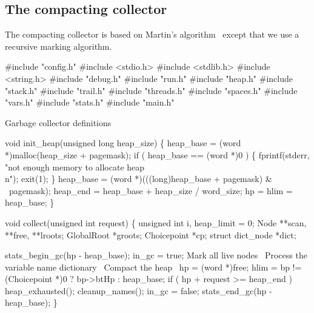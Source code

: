 %
%
\subsection{The compacting collector}
The compacting collector is based on Martin's                                %
algorithm~\cite{Martin82:Compaction} except that we use a recursive
marking algorithm.

\nwenddocs{}\endmoddef\nwstartdeflinemarkup{}\nwenddeflinemarkup
#include "config.h"
#include <stdio.h>
#include <stdlib.h>
#include <string.h>       
#include "debug.h"
#include "run.h"
#include "heap.h"
#include "stack.h"
#include "trail.h"
#include "threads.h"
#include "spaces.h"
#include "vars.h"
#include "stats.h"
#include "main.h"

\LA{}Garbage collector definitions~{\nwtagstyle{}}\RA{}

void
init_heap(unsigned long heap_size)
\{
    heap_base = (word *)malloc(heap_size + pagemask);
    if ( heap_base == (word *)0 )
    \{
        fprintf(stderr, "not enough memory to allocate heap\\n");
        exit(1);
    \}
    heap_base = (word *)(((long)heap_base + pagemask) & ~pagemask);
    heap_end  = heap_base + heap_size / word_size;
    hp = hlim = heap_base;
\}

void
collect(unsigned int request)
\{
    unsigned int     i, heap_limit = 0;
    Node             **scan, **free, **lroots;
    GlobalRoot       *groots;
    Choicepoint      *cp;
    struct dict_node *dict;

    stats_begin_gc(hp - heap_base);
    in_gc = true;
    \LA{}Mark all live nodes~{\nwtagstyle{}}\RA{}
    \LA{}Process the variable name dictionary~{\nwtagstyle{}}\RA{}
    \LA{}Compact the heap~{\nwtagstyle{}}\RA{}
    hp   = (word *)free;
    hlim = bp != (Choicepoint *)0 ? bp->btHp : heap_base;
    if ( hp + request >= heap_end )
        heap_exhausted();
    cleanup_names();
    in_gc = false;
    stats_end_gc(hp - heap_base);
\}

